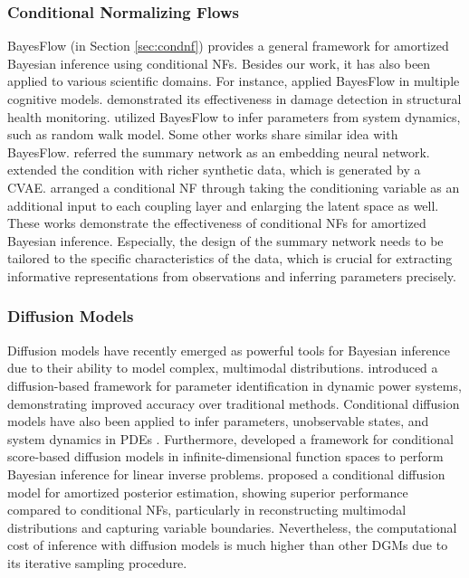 \subsubsection{Conditional Normalizing Flows}
BayesFlow (in Section \ref{sec:condnf}) \citep{radev2020bayesflow} provides a general framework for amortized Bayesian inference using conditional \acp{NF}. Besides our work, it has also been applied to various scientific domains. For instance, \citeauthor{Kucharsk2025} \citeyearpar{Kucharsk2025} applied BayesFlow in multiple cognitive models. \citeauthor{Zeng2023} \citeyearpar{Zeng2023} demonstrated its effectiveness in damage detection in structural health monitoring. \citeauthor{Rahmandad2025_uh} \citeyearpar{Rahmandad2025_uh} utilized BayesFlow to infer parameters from system dynamics, such as random walk model. Some other works share similar idea with BayesFlow. \citeauthor{De_Santi_2024} \citeyearpar{De_Santi_2024} referred the summary network as an embedding neural network. \citeauthor{zhdanov2022gisaxs} \citeyearpar{zhdanov2022gisaxs} extended the condition with richer synthetic data, which is generated by a \ac{CVAE}. \citeauthor{DONG2025117457} \citeyearpar{DONG2025117457} arranged a conditional \ac{NF} through taking the conditioning variable as an additional input to each coupling layer and enlarging the latent space as well. These works demonstrate the effectiveness of conditional \acp{NF} for amortized Bayesian inference. Especially, the design of the summary network needs to be tailored to the specific characteristics of the data, which is crucial for extracting informative representations from observations and inferring parameters precisely.

\subsubsection{Diffusion Models}
Diffusion models have recently emerged as powerful tools for Bayesian inference due to their ability to model complex, multimodal distributions. \citeauthor{zhu2025diffusion} \citeyearpar{zhu2025diffusion} introduced a diffusion-based framework for parameter identification in dynamic power systems, demonstrating improved accuracy over traditional methods. Conditional diffusion models have also been applied to infer parameters, unobservable states, and system dynamics in \acp{PDE} \citep{haitsiukevich2024}. Furthermore, \citeauthor{baldassari2023} \citeyearpar{baldassari2023} developed a framework for conditional score-based diffusion models in infinite-dimensional function spaces to perform Bayesian inference for linear inverse problems. \citeauthor{chen2025conddiff} \citeyearpar{chen2025conddiff} proposed a conditional diffusion model for amortized posterior estimation, showing superior performance compared to conditional \acp{NF}, particularly in reconstructing multimodal distributions and capturing variable boundaries. Nevertheless, the computational cost of inference with diffusion models is much higher than other \acp{DGM} due to its iterative sampling procedure.

